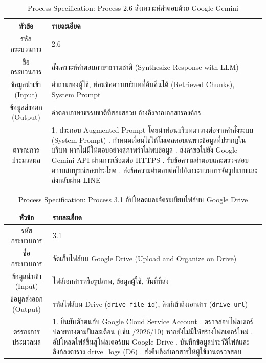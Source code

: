 \begin{table}[htbp]
\centering
\caption{Process Specification: Process 2.6 สังเคราะห์คำตอบด้วย Google Gemini}
\label{tab3:pspec2_6}
\begin{tabularx}{\textwidth}{| c | L |}
\hline
\textbf{หัวข้อ} & \textbf{รายละเอียด} \\ \hline
รหัสกระบวนการ & 2.6 \\ \hline
ชื่อกระบวนการ & สังเคราะห์คำตอบภาษาธรรมชาติ (Synthesize Response with LLM) \\ \hline
ข้อมูลนำเข้า (Input) & คำถามของผู้ใช้, ท่อนข้อความบริบทที่ค้นคืนได้ (Retrieved Chunks), System Prompt \\ \hline
ข้อมูลส่งออก (Output) & คำตอบภาษาธรรมชาติที่สละสลวย อ้างอิงจากเอกสารองค์กร \\ \hline
ตรรกะการประมวลผล & 1. ประกอบ Augmented Prompt โดยนำท่อนบริบทมาวางต่อจากคำสั่งระบบ (System Prompt) . กำหนดเงื่อนไขให้โมเดลตอบเฉพาะข้อมูลที่ปรากฏในบริบท หากไม่มีให้ตอบอย่างสุภาพว่าไม่พบข้อมูล . ส่งคำขอไปยัง Google Gemini API ผ่านการเชื่อมต่อ HTTPS . รับข้อความคำตอบและตรวจสอบความสมบูรณ์ของประโยค . ส่งข้อความคำตอบต่อไปยังกระบวนการจัดรูปแบบและส่งกลับผ่าน LINE \\ \hline
\end{tabularx}
\end{table}

\begin{table}[htbp]
\centering
\caption{Process Specification: Process 3.1 อัปโหลดและจัดระเบียบไฟล์บน Google Drive}
\label{tab3:pspec3_1}
\begin{tabularx}{\textwidth}{| c | L |}
\hline
\textbf{หัวข้อ} & \textbf{รายละเอียด} \\ \hline
รหัสกระบวนการ & 3.1 \\ \hline
ชื่อกระบวนการ & จัดเก็บไฟล์บน Google Drive (Upload and Organize on Drive) \\ \hline
ข้อมูลนำเข้า (Input) & ไฟล์เอกสารหรือรูปภาพ, ข้อมูลผู้ใช้, วันที่ที่ส่ง \\ \hline
ข้อมูลส่งออก (Output) & รหัสไฟล์บน Drive (\texttt{drive\_file\_id}), ลิงก์เข้าถึงเอกสาร (\texttt{drive\_url}) \\ \hline
ตรรกะการประมวลผล & 1. ยืนยันตัวตนกับ Google Cloud Service Account . ตรวจสอบโฟลเดอร์ปลายทางตามปีและเดือน (เช่น /2026/10) หากยังไม่มีให้สร้างโฟลเดอร์ใหม่ . อัปโหลดไฟล์ขึ้นสู่โฟลเดอร์บน Google Drive . บันทึกข้อมูลประวัติไฟล์และลิงก์ลงตาราง drive\_logs (D6) . ส่งคืนลิงก์เอกสารให้ผู้ใช้งานตรวจสอบ \\ \hline
\end{tabularx}
\end{table}


